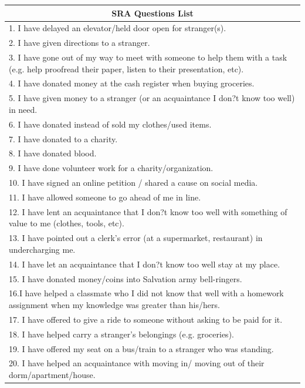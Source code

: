 \documentclass{article}
\begin{document}
\begin{tabular}{ | p{12cm} | }
\hline
\multicolumn{1}{|c|}{SRA Questions List} \\
\hline
1. I have delayed an elevator/held door open for stranger(s).\\
\hline
2. I have given directions to a stranger.\\
\hline
3. I have gone out of my way to meet with someone to help them with a task (e.g. help proofread their paper, listen to their presentation, etc).\\
\hline
4. I have donated money at the cash register when buying groceries.\\
\hline
5. I have given money to a stranger (or an acquaintance I don?t know too well) in need.\\
\hline
6. I have donated instead of sold my clothes/used items.\\
\hline
7. I have donated to a charity.\\
\hline
8. I have donated blood.\\
\hline
9. I have done volunteer work for a charity/organization.\\
\hline
10.  I have signed an online petition / shared a cause on social media.\\
\hline
11. I have allowed someone to go ahead of me in line.\\
\hline
12. I have lent an acquaintance that I don?t know too well with something of value to me (clothes, tools, etc).\\
\hline
13. I have pointed out a clerk\rq s error (at a supermarket, restaurant) in undercharging me.\\
\hline
14. I have let an acquaintance that I don?t know too well stay at my place.\\
\hline
15. I have donated money/coins into Salvation army bell-ringers.\\
\hline
16.I have helped a classmate who I did not know that well with a homework assignment when my knowledge was greater than his/hers.\\
\hline
17. I have offered to give a ride to someone without asking to be paid for it.\\
\hline
18.  I have helped carry a stranger\rq s belongings (e.g. groceries).\\
\hline
19. I have offered my seat on a bus/train to a stranger who was standing.\\
\hline
20. I have helped an acquaintance with moving in/ moving out of their dorm/apartment/house.\\
\hline
\end{tabular}
\end{document}
